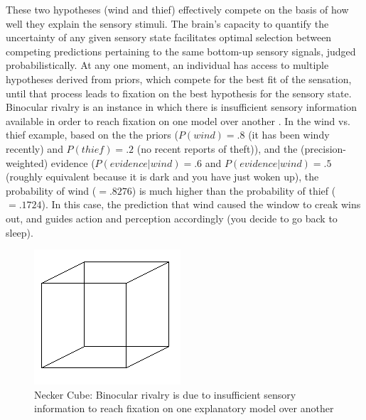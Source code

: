 \begin{CJK}{UTF8}{gbsn}
These two hypotheses (wind and thief) effectively compete on the basis of how well they explain the sensory stimuli.  The brain's capacity to quantify the uncertainty of any given sensory state facilitates optimal selection between competing predictions pertaining to the same bottom-up sensory signals, judged probabilistically.  At any one moment, an individual has access to multiple hypotheses derived from priors, which compete for the best fit of the sensation, until that process leads to fixation on the best hypothesis for the sensory state.  Binocular rivalry is an instance in which there is insufficient sensory information available in order to reach fixation on one model over another \citep[for example, looking at a necker cube, see Figure ~\ref{fig:neckerCube}][]{Frith2007}.  In the wind vs. thief example, based on the the priors ($P(wind) = .8$ (it has been windy recently) and $P(thief) = .2$ (no recent reports of theft)), and the (precision-weighted) evidence ($P(evidence|wind) = .6$ and $P(evidence|wind) = .5$ (roughly equivalent because it is dark and you have just woken up), the probability of wind ($= .8276$) is much higher than the probability of thief ($= .1724$).  In this case, the prediction that wind caused the window to creak wins out, and guides action and perception accordingly (you decide to go back to sleep).

\begin{figure}[htbp]
  \begin{center}
    \includegraphics[scale=.7]{images/Necker_cube.png}
      \caption{Necker Cube: Binocular rivalry is due to insufficient sensory information to reach fixation on one explanatory model over another}
        \label{fig:neckerCube}
   \end{center}
\end{figure}


\end{CJK}
